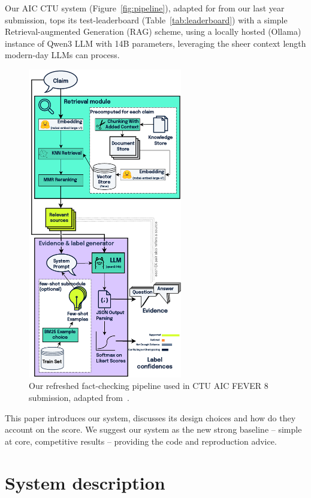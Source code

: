 Our AIC CTU system (Figure~\ref{fig:pipeline}), adapted for \averitec{} from our last year submission, tops its test-leaderboard (Table~\ref{tab:leaderboard}) with a simple Retrieval-augmented Generation (RAG) scheme, using a locally hosted (Ollama) instance of Qwen3 LLM with 14B parameters, leveraging the sheer 
context length modern-day LLMs can process.
\begin{figure}[h]
    \centering
    \includegraphics[width=0.6\textwidth]{figures/pipeline2025.pdf}
    \caption{Our refreshed fact-checking pipeline used in CTU AIC FEVER 8 submission, adapted from~\cite {ullrich-etal-2024-aic}.}
    \label{fig:pipeline2025}
\end{figure}


This paper introduces our system, discusses its design choices and how do they account on the score.
We suggest our system as the new strong baseline -- simple at core, competitive results -- providing the code and reproduction advice.


\section{System description}
\label{sec:system2025}

